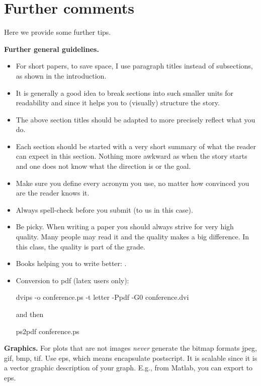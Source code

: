 \documentclass[conference]{IEEEtran}
\newcommand{\mypar}[1]{{\bf #1.}}
\begin{document}
\section{Further comments}

Here we provide some further tips.

\mypar{Further general guidelines}

\begin{itemize}
\item For short papers, to save space, I use paragraph titles instead of
subsections, as shown in the introduction.

\item It is generally a good idea to break sections into such smaller
units for readability and since it helps you to (visually) structure the story.

\item The above section titles should be adapted to more precisely
reflect what you do.

\item Each section should be started with a very
short summary of what the reader can expect in this section. Nothing
more awkward as when the story starts and one does not know what the
direction is or the goal.

\item Make sure you define every acronym you use, no matter how
convinced you are the reader knows it.

\item Always spell-check before you submit (to us in this case).

\item Be picky. When writing a paper you should always strive for very
high quality. Many people may read it and the quality makes a big difference.
In this class, the quality is part of the grade.

\item Books helping you to write better: \cite{Strunk:00}.

\item Conversion to pdf (latex users only): 

dvips -o conference.ps -t letter -Ppdf -G0 conference.dvi

and then

ps2pdf conference.ps
\end{itemize}

\mypar{Graphics} For plots that are not images {\em never} generate the bitmap formats
jpeg, gif, bmp, tif. Use eps, which means encapsulate postscript. It is
scalable since it is a vector graphic description of your graph. E.g.,
from Matlab, you can export to eps.
\end{document}
